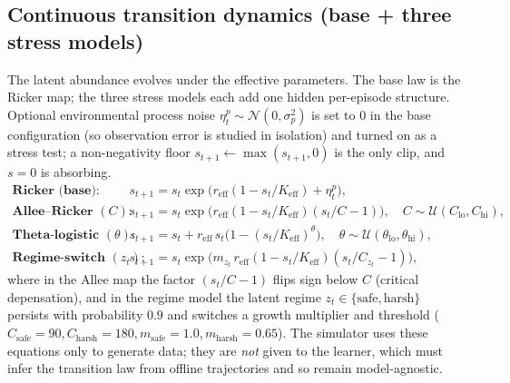 \documentclass[11pt]{article}
\newcommand{\reff}{r_{\mathrm{eff}}}
\newcommand{\Keff}{K_{\mathrm{eff}}}
\begin{document}
\subsection{Continuous transition dynamics (base + three stress models)}
The latent abundance evolves under the effective parameters. The base law is the
Ricker map; the three stress models each add one hidden per-episode structure.
Optional environmental process noise $\eta^{p}_t \sim \mathcal{N}(0,\sigma_p^2)$
is set to $0$ in the base configuration (so observation error is studied in
isolation) and turned on as a stress test; a non-negativity floor
$s_{t+1}\leftarrow\max(s_{t+1},0)$ is the only clip, and $s=0$ is absorbing.
\begin{align}
\textbf{Ricker (base):}\quad
& s_{t+1} = s_t \exp\!\big(\reff(1 - s_t/\Keff) + \eta^p_t\big), \\
\textbf{Allee--Ricker } (C):\quad
& s_{t+1} = s_t \exp\!\big(\reff(1 - s_t/\Keff)(s_t/C - 1)\big), \quad C\sim\mathcal{U}(C_{\mathrm{lo}},C_{\mathrm{hi}}), \\
\textbf{Theta-logistic } (\theta):\quad
& s_{t+1} = s_t + \reff\, s_t\big(1 - (s_t/\Keff)^{\theta}\big), \quad \theta\sim\mathcal{U}(\theta_{\mathrm{lo}},\theta_{\mathrm{hi}}), \\
\textbf{Regime-switch } (z_t):\quad
& s_{t+1} = s_t \exp\!\big(m_{z_t}\,\reff(1 - s_t/\Keff)(s_t/C_{z_t} - 1)\big),
\end{align}
where in the Allee map the factor $(s_t/C-1)$ flips sign below $C$ (critical
depensation), and in the regime model the latent regime $z_t\in\{\text{safe},
\text{harsh}\}$ persists with probability $0.9$ and switches a growth multiplier
and threshold ($C_{\text{safe}}{=}90, C_{\text{harsh}}{=}180, m_{\text{safe}}{=}1.0,
m_{\text{harsh}}{=}0.65$). The simulator uses these equations only to generate
data; they are \emph{not} given to the learner, which must infer the transition
law from offline trajectories and so remain model-agnostic.
\end{document}
